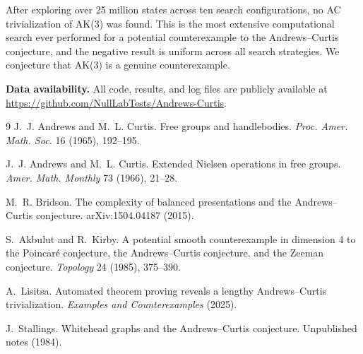 \documentclass[12pt,a4paper]{article}
\begin{document}
After exploring over 25 million states across ten search configurations, no AC trivialization of AK(3) was found. This is the most extensive computational search ever performed for a potential counterexample to the Andrews--Curtis conjecture, and the negative result is uniform across all search strategies. We conjecture that AK(3) is a genuine counterexample.

\medskip
\noindent\textbf{Data availability.} All code, results, and log files are publicly available at \url{https://github.com/NullLabTests/Andrews-Curtis}.

\begin{thebibliography}{9}
J.~J. Andrews and M.~L. Curtis.
\newblock Free groups and handlebodies.
\newblock \emph{Proc. Amer. Math. Soc.} 16 (1965), 192--195.

J.~J. Andrews and M.~L. Curtis.
\newblock Extended Nielsen operations in free groups.
\newblock \emph{Amer. Math. Monthly} 73 (1966), 21--28.

M.~R. Bridson.
\newblock The complexity of balanced presentations and the Andrews--Curtis conjecture.
\newblock arXiv:1504.04187 (2015).

S.~Akbulut and R.~Kirby.
\newblock A potential smooth counterexample in dimension 4 to the Poincar\'e conjecture, the Andrews--Curtis conjecture, and the Zeeman conjecture.
\newblock \emph{Topology} 24 (1985), 375--390.

A.~Lisitsa.
\newblock Automated theorem proving reveals a lengthy Andrews--Curtis trivialization.
\newblock \emph{Examples and Counterexamples} (2025).

J.~Stallings.
\newblock Whitehead graphs and the Andrews--Curtis conjecture.
\newblock Unpublished notes (1984).
\end{thebibliography}
\end{document}
